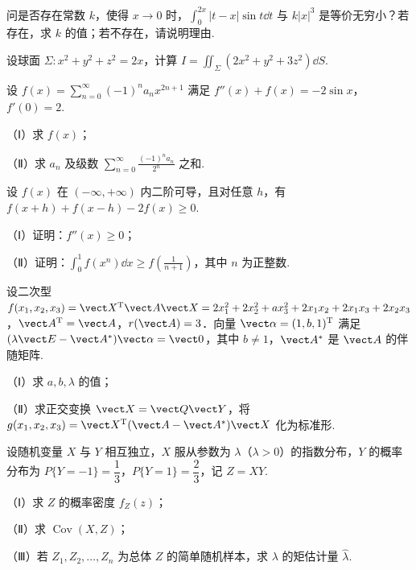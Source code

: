 \begin{question}[index=17,points=10]
问是否存在常数 $k$，使得 $x\to0$ 时，$\displaystyle\int_0^{2x}|t-x|\sin t\dd t$ 与 $k|x|^3$ 是等价无穷小？若存在，求 $k$ 的值；若不存在，请说明理由.
\end{question}
\QuestionBreak\WorkSpace

\begin{question}[index=18,points=12]
设球面 $\Sigma:x^2+y^2+z^2=2x$，计算 $\displaystyle I=\iint_\Sigma(2x^2+y^2+3z^2)\dd S$.
\end{question}
\QuestionBreak\WorkSpace\WorkPageBreak

\begin{question}[index=19,points=12]
设 $\displaystyle f(x)=\sum_{n=0}^\infty(-1)^na_nx^{2n+1}$ 满足 $f''(x)+f(x)=-2\sin x$，$f'(0)=2$.
\par（Ⅰ）求 $f(x)$；
\par（Ⅱ）求 $a_n$ 及级数 $\displaystyle\sum_{n=0}^\infty\frac{(-1)^na_n}{2^n}$ 之和.
\end{question}
\QuestionBreak\WorkSpace

\begin{question}[index=20,points=12]
设 $f(x)$ 在 $(-\infty,+\infty)$ 内二阶可导，且对任意 $h$，有 $f(x+h)+f(x-h)-2f(x)\ge0$.
\par（Ⅰ）证明：$f''(x)\ge0$；
\par（Ⅱ）证明：$\displaystyle\int_0^1f(x^n)\dd x\ge f\!\left(\frac1{n+1}\right)$，其中 $n$ 为正整数.
\end{question}
\QuestionBreak\WorkSpace\WorkPageBreak

\begin{question}[index=21,points=12]
设二次型 $f(x_1,x_2,x_3)=\vect X^{\mathrm T}\vect A\vect X=2x_1^2+2x_2^2+ax_3^2+2x_1x_2+2x_1x_3+2x_2x_3$，$\vect A^{\mathrm T}=\vect A$，$r(\vect A)=3$．向量 $\vect\alpha=(1,b,1)^{\mathrm T}$ 满足 $(\lambda\vect E-\vect A^*)\vect\alpha=\vect0$，其中 $b\ne1$，$\vect A^*$ 是 $\vect A$ 的伴随矩阵.
\par（Ⅰ）求 $a,b,\lambda$ 的值；
\par（Ⅱ）求正交变换 $\vect X=\vect Q\vect Y$，将 $g(x_1,x_2,x_3)=\vect X^{\mathrm T}(\vect A-\vect A^*)\vect X$ 化为标准形.
\end{question}
\QuestionBreak\WorkSpace

\begin{question}[index=22,points=12]
设随机变量 $X$ 与 $Y$ 相互独立，$X$ 服从参数为 $\lambda$（$\lambda>0$）的指数分布，$Y$ 的概率分布为 $P\{Y=-1\}=\dfrac13$，$P\{Y=1\}=\dfrac23$，记 $Z=XY$.
\par（Ⅰ）求 $Z$ 的概率密度 $f_Z(z)$；
\par（Ⅱ）求 $\operatorname{Cov}(X,Z)$；
\par（Ⅲ）若 $Z_1,Z_2,\ldots,Z_n$ 为总体 $Z$ 的简单随机样本，求 $\lambda$ 的矩估计量 $\widehat\lambda$.
\end{question}
\WorkSpace
